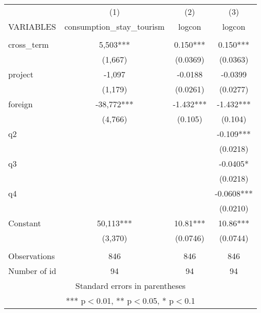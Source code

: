 \documentclass[]{article}
\begin{document}
\begin{tabular}{lccc} \hline
 & (1) & (2) & (3) \\
VARIABLES & consumption\_stay\_tourism & logcon & logcon \\ \hline
 &  &  &  \\
cross\_term & 5,503*** & 0.150*** & 0.150*** \\
 & (1,667) & (0.0369) & (0.0363) \\
project & -1,097 & -0.0188 & -0.0399 \\
 & (1,179) & (0.0261) & (0.0277) \\
foreign & -38,772*** & -1.432*** & -1.432*** \\
 & (4,766) & (0.105) & (0.104) \\
q2 &  &  & -0.109*** \\
 &  &  & (0.0218) \\
q3 &  &  & -0.0405* \\
 &  &  & (0.0218) \\
q4 &  &  & -0.0608*** \\
 &  &  & (0.0210) \\
Constant & 50,113*** & 10.81*** & 10.86*** \\
 & (3,370) & (0.0746) & (0.0744) \\
 &  &  &  \\
Observations & 846 & 846 & 846 \\
 Number of id & 94 & 94 & 94 \\ \hline
\multicolumn{4}{c}{ Standard errors in parentheses} \\
\multicolumn{4}{c}{ *** p$<$0.01, ** p$<$0.05, * p$<$0.1} \\
\end{tabular}
\end{document}
